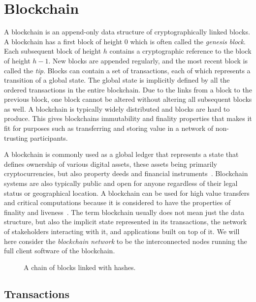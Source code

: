 \section{Blockchain}
\label{sec:blockchain}

A blockchain is an append-only data structure of cryptographically linked blocks. A blockchain has a first block of height 0 which is often called the \emph{genesis block}. Each subsequent block of height $h$ contains a cryptographic reference to the block of height $h-1$. New blocks are appended regularly, and the most recent block is called the \emph{tip}. Blocks can contain a set of transactions, each of which represents a transition of a global state. The global state is implicitly defined by all the ordered transactions in the entire blockchain. Due to the links from a block to the previous block, one block cannot be altered without altering all subsequent blocks as well. A blockchain is typically widely distributed and blocks are hard to produce. This gives blockchains immutability and finality properties that makes it fit for purposes such as transferring and storing value in a network of non-trusting participants.

A blockchain is commonly used as a global ledger that represents a state that defines ownership of various digital assets, these assets being primarily cryptocurrencies, but also property deeds and financial instruments~\cite{tschorsch_bitcoin_2016}. Blockchain systems are also typically public and open for anyone regardless of their legal status or geographical location. A blockchain can be used for high value transfers and critical computations because it is considered to have the properties of finality and liveness~\cite{garay_bitcoin_2015}. 
The term blockchain usually does not mean just the data structure, but also the implicit state represented in its transactions, the network of stakeholders interacting with it, and applications built on top of it. We will here consider the \emph{blockchain network} to be the interconnected nodes running the full client software of the blockchain.

\begin{figure}[htbp]
  \centering
  
  \caption{A chain of blocks linked with hashes.}
  \label{fig:blockchain}
\end{figure}

\subsection{Transactions}


